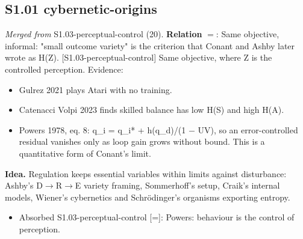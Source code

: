 \documentclass[10pt]{article}
\begin{document}
\subsection{S1.01 cybernetic-origins}\label{node:S1-S1-01-cybernetic-origins}
\textit{Merged from} S1.03-perceptual-control (20). \textbf{Relation} $=$: Same objective, informal: "small outcome variety" is the criterion that Conant and Ashby later wrote as H(Z). [S1.03-perceptual-control] Same objective, where Z is the controlled perception. Evidence:
\begin{itemize}[nosep,leftmargin=1.2em]
\item Gulrez 2021 plays Atari with no training.
\item Catenacci Volpi 2023 finds skilled balance has low H(S) and high H(A).
\item Powers 1978, eq. 8: q\_i = q\_i* + h(q\_d)/(1 \ensuremath{-} UV), so an error-controlled residual vanishes only as loop gain grows without bound. This is a quantitative form of Conant's limit.
\end{itemize}


\textbf{Idea.} Regulation keeps essential variables within limits against disturbance: Ashby's D\ensuremath{\to}R\ensuremath{\to}E variety framing, Sommerhoff's setup, Craik's internal models, Wiener's cybernetics and Schr\"odinger's organisms exporting entropy.
\begin{itemize}[nosep,leftmargin=1.2em]
\item Absorbed S1.03-perceptual-control [=]: Powers: behaviour is the control of perception.
\end{itemize}
\end{document}
